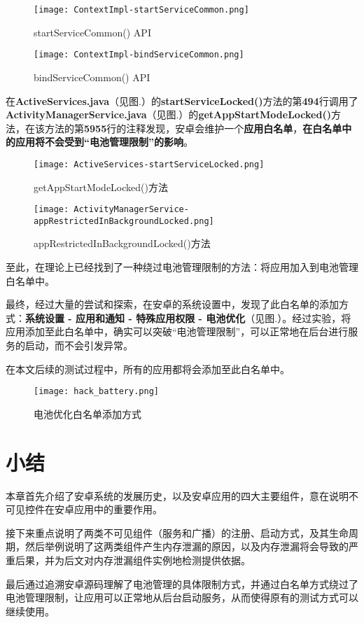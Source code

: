 \begin{figure}[htbp]
	\centering
	\texttt{[image: ContextImpl-startServiceCommon.png]} %
	\caption{startServiceCommon() API}
	\label{fig:source code:startServiceCommon}
\end{figure}


\begin{figure}[htbp]
	\centering
	\texttt{[image: ContextImpl-bindServiceCommon.png]} %
	\caption{bindServiceCommon() API}
	\label{fig:source code:bindServiceCommon}
\end{figure}

在\textbf{ActiveServices.java}（见图.\redbf{\ref{fig:source code:getAppStartModeLocked}}）的\textbf{startServiceLocked()}方法的第\textbf{494}行调用了\textbf{ActivityManagerService.java}（见图.\redbf{\ref{fig:source code:appRestrictedInBackgroundLocked}}）的\textbf{getAppStartModeLocked()}方法，在该方法的第\textbf{5955}行的注释发现，安卓会维护一个\textbf{应用白名单}，\textbf{在白名单中的应用将不会受到“电池管理限制”的影响}。

\begin{figure}[htbp]
	\centering
	\texttt{[image: ActiveServices-startServiceLocked.png]} %
	\caption{getAppStartModeLocked()方法}
	\label{fig:source code:getAppStartModeLocked}
\end{figure}

\begin{figure}[htbp]
	\centering
	\texttt{[image: ActivityManagerService-appRestrictedInBackgroundLocked.png]} %
	\caption{appRestrictedInBackgroundLocked()方法}
	\label{fig:source code:appRestrictedInBackgroundLocked}
\end{figure}

至此，在理论上已经找到了一种绕过电池管理限制的方法：将应用加入到电池管理白名单中。

最终，经过大量的尝试和探索，在安卓的系统设置中，发现了此白名单的添加方式：\textbf{系统设置 - 应用和通知 - 特殊应用权限 - 电池优化}（见图.\redbf{\ref{fig:hack-battery}}）。经过实验，将应用添加至此白名单中，确实可以突破“电池管理限制”，可以正常地在后台进行服务的启动，而不会引发异常。

在本文后续的测试过程中，所有的应用都将会添加至此白名单中。

\begin{figure}[htbp]
	\centering
	\texttt{[image: hack\_battery.png]} %
	\caption{电池优化白名单添加方式}
	\label{fig:hack-battery}
\end{figure}

\section{小结}

本章首先介绍了安卓系统的发展历史，以及安卓应用的四大主要组件，意在说明不可见控件在安卓应用中的重要作用。

接下来重点说明了两类不可见组件（服务和广播）的注册、启动方式，及其生命周期，然后举例说明了这两类组件产生内存泄漏的原因，以及内存泄漏将会导致的严重后果，并为后文对内存泄漏组件实例地检测提供依据。

最后通过追溯安卓源码理解了电池管理的具体限制方式，并通过白名单方式绕过了电池管理限制，让应用可以正常地从后台启动服务，从而使得原有的测试方式可以继续使用。